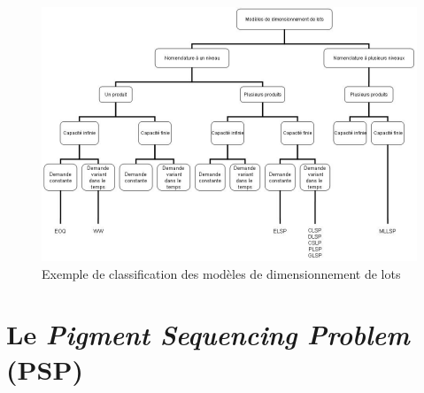 	\begin{center}
		\begin{figure}[!h]
			\includegraphics[scale=.5]{images/classification_dimensionnement.png}
			\caption{Exemple de classification des modèles de dimensionnement de lots \cite{cathy}}
			\label{fig:classification_dimensionnement_lots}
		\end{figure}
	\end{center}

	\newpage
	
	\section{Le \emph{Pigment Sequencing Problem} (PSP)}
	
